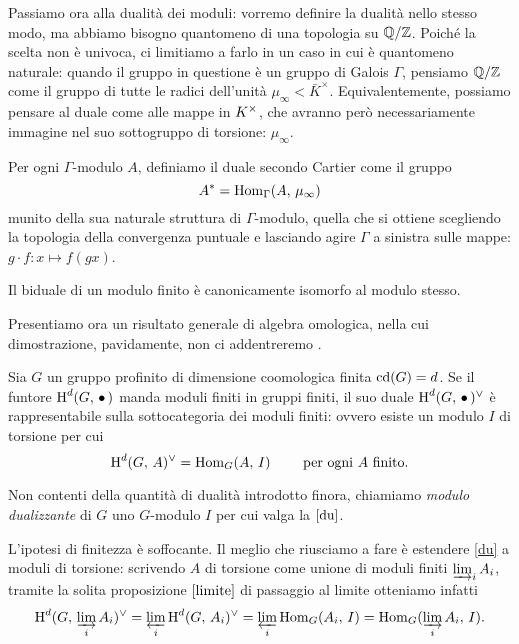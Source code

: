 Passiamo ora alla dualità dei moduli: vorremo definire la dualità nello stesso modo, ma abbiamo bisogno quantomeno di una topologia su $ \mathbb{Q}/\mathbb{Z} $. Poiché la scelta non è univoca, ci limitiamo a farlo in un caso in cui è quantomeno naturale: quando il gruppo in questione è un gruppo di Galois $ \Gamma $, pensiamo $ \mathbb{Q}/\mathbb{Z} $ come il gruppo di tutte le radici dell'unità $ \mu_\infty < \bar{K}^\times $. Equivalentemente, possiamo pensare al duale come alle mappe in $ K^\times $, che avranno però necessariamente immagine nel suo sottogruppo di torsione: $ \mu_\infty. $

\begin{definition}
	Per ogni $ \Gamma $-modulo $ A $, definiamo il duale secondo Cartier come il gruppo
	\[ A^* = \operatorname{Hom}_\Gamma(A, \, \mu_\infty) \]
	munito della sua naturale struttura di $ \Gamma $-modulo, quella che si ottiene scegliendo la topologia della convergenza puntuale e lasciando agire $ \Gamma $ a sinistra sulle mappe: $ g \cdot f \colon x \mapsto f(gx) $.
\end{definition}

\begin{proposition}
	Il biduale di un modulo finito è canonicamente isomorfo al modulo stesso.
\end{proposition}

Presentiamo ora un risultato generale di algebra omologica, nella cui dimostrazione, pavidamente, non ci addentreremo \cite[I.3.6]{SerreGalois}.
\begin{proposition}
	Sia $ G $ un gruppo profinito di dimensione coomologica finita $ \operatorname{cd}(G) = d $. Se il funtore $ \operatorname{H}^d(G,\, \bullet\,) $ manda moduli finiti in gruppi finiti, il suo duale $ \operatorname{H}^d(G,\, \bullet\,)^\vee $ è rappresentabile sulla sottocategoria dei moduli finiti: ovvero esiste un modulo $ I $ di torsione per cui
	\begin{equation}\label{du}
		\operatorname{H}^d(G, \, A )^\vee = \operatorname{Hom}_G(A , \, I) \qquad \text{ per ogni } A \text{ finito.}
	\end{equation}
\end{proposition}

\begin{definition}
	Non contenti della quantità di dualità introdotto finora, chiamiamo \emph{modulo dualizzante} di $ G $ uno $ G $-modulo $ I $ per cui valga la $ \eqref{du} $.
\end{definition}

L'ipotesi di finitezza è soffocante. Il meglio che riusciamo a fare è estendere \eqref{du} a moduli di torsione: scrivendo $ A $ di torsione come unione di moduli finiti $ \varinjlim_i A_i $, tramite la solita proposizione $ \ref{limite} $ di passaggio al limite otteniamo infatti
\[ \operatorname{H}^d(G, \, \varinjlim_i A_i )^\vee = \varprojlim_i \operatorname{H}^d(G, \, A_i )^\vee = \varprojlim_i \operatorname{Hom}_G(A_i , \, I) = \operatorname{Hom}_G(\varinjlim_i A_i , \, I). \]

